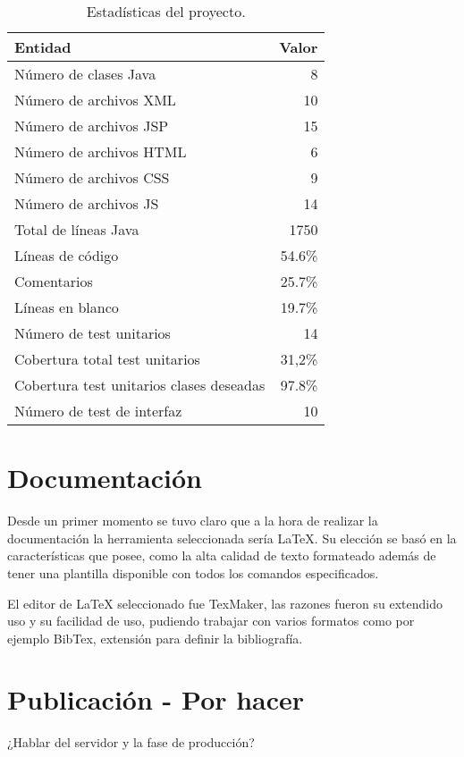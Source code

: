 \begin{table}
\centering
\begin{tabular}{lr}
\toprule
\textbf{Entidad} & \multicolumn{1}{r}{\textbf{Valor}} \\ 
\midrule
Número de clases Java              & 8                  \\
Número de archivos XML             & 10                 \\
Número de archivos JSP             & 15                 \\
Número de archivos HTML            & 6                  \\
Número de archivos CSS             & 9                  \\
Número de archivos JS              & 14                 \\
\midrule
Total de líneas Java               & 1750              	\\
Líneas de código                   & 54.6\%            	\\
Comentarios                        & 25.7\%             \\
Líneas en blanco                   & 19.7\%    		    \\
\midrule
Número de test unitarios           & 14					\\
Cobertura total test unitarios     & 31,2\%             \\
Cobertura test unitarios clases deseadas & 97.8\%       \\
Número de test de interfaz         & 10					\\ 
\bottomrule
\end{tabular}
\caption{Estadísticas del proyecto.}
\label{stats}
\end{table}


\section{Documentación}

Desde un primer momento se tuvo claro que a la hora de realizar la documentación la herramienta seleccionada sería LaTeX. Su elección se basó en la características que posee, como la alta calidad de texto formateado además de tener una plantilla disponible con todos los comandos especificados.

El editor de LaTeX seleccionado fue TexMaker, las razones fueron su extendido uso y su facilidad de uso, pudiendo trabajar con varios formatos como por ejemplo BibTex, extensión para definir la bibliografía.

\section{Publicación - Por hacer}

¿Hablar del servidor y la fase de producción?